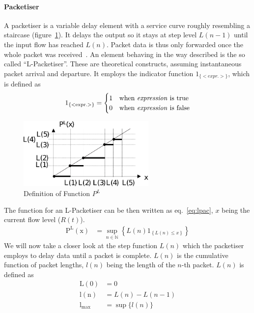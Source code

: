 \paragraph{Packetiser}
A packetiser is a variable delay element with a service curve roughly resembling a staircase (figure~\ref{fig:nc_pack}).
It delays the output so it stays at step level $L(n-1)$ until the input flow has reached $L(n)$.
Packet data is thus only forwarded once the whole packet was received~\cite[pp. 218]{thiran_network_2001}.
An element behaving in the way described is the so called \enquote{L-Packetiser}. These are theoretical constructs, assuming instantaneous packet arrival and departure.
It employs the indicator function $1_{\{<expr.>\}}$, which is defined as
%
\begin{align}
\mathrm{1_{\{<expr.>\}}} =
\begin{cases}
1 & \text{when \emph{expression} is true}\\
0 & \text{when \emph{expression} is false}
\end{cases}
\label{eq:func_ind}
\end{align}
%
\begin{figure}[H]
  \centering
  \includegraphics*[width=0.6\textwidth,height=\textheight,keepaspectratio]{Figures/nc_basics_pack}
  \caption{Definition of Function $P^L$~\cite{thiran_network_2001}}
  \label{fig:nc_pack}
\end{figure}
\noindent
The function for an L-Packetiser can be then written as eq.~\ref{eq:lpac}, $x$ being the current flow level ($R(t)$).
%
\begin{align}
\mathrm{P^L(x)} &= \sup_{n \in \mathbb{N}}\left\{ L(n)1_{\left\{L(n)\le x\right\}}\right\}
\label{eq:lpac}
\end{align}
%
We will now take a closer look at the step function $L(n)$ which the packetiser employs to delay data until a packet is complete.
$L(n)$ is the cumulative function of packet lengths,  $l(n)$ being the length of the $n$-th packet.
$L(n)$ is defined as
%
\begin{equation}
\begin{aligned}
\mathrm{L(0)} &= 0\\
\mathrm{l(n)} &= L(n) - L(n-1)\\
\mathrm{l_{max}} &= \sup \{l(n)\}
\label{eq:l_gen}
\end{aligned}
\end{equation}
